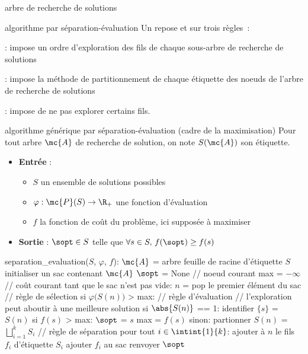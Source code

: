 \begin{adjustwidth}{-3cm}{-3cm}
\begin{definition}{6.10}{arbre de recherche de solutions}
\end{definition}

\begin{definition}{6.10}{algorithme par séparation-évaluation}
    Un  repose  et sur trois règles~:
    \begin{enumeratebf}
        \item {} : impose un ordre d'exploration des fils de chaque sous-arbre de recherche de solutions
        \item {} : impose la méthode de partitionnement de chaque étiquette des noeuds de l'arbre de recherche de solutions
        \item {} : impose de ne pas explorer certains fils.
    \end{enumeratebf}
\end{definition}

\begin{implementation}{algorithme générique par séparation-évaluation (cadre de la maximisation)}
    Pour tout arbre $\mc{A}$ de recherche de solution, on note $S(\mc{A})$ son étiquette.
    \begin{itemize}
        \item \textbf{Entrée} :
        \begin{itemize}
            \item $S$ un ensemble de solutions possibles
            \item $\varphi : \mc{P}(S) \to \R_+$ une fonction d'évaluation
            \item $f$ la fonction de coût du problème, ici supposée à maximiser
        \end{itemize}
        \item \textbf{Sortie} : $\sopt \in S$ telle que $\forall s \in S,\, f(\sopt) \geq f(s)$
    \end{itemize}
    \begin{lstLNat}
    separation_evaluation($S$, $\varphi$, $f$):
        $\mc{A}$ = arbre feuille de racine d'étiquette $S$
        initialiser un sac contenant $\mc{A}$
        $\sopt$ = None // noeud courant
        max = $-\infty$ // coût courant
        tant que le sac n'est pas vide:
            $n$ = pop le premier élément du sac // règle de sélection
            si $\varphi\big(S(n)\big)$ > max: // règle d'évaluation
                // l'exploration peut aboutir à une meilleure solution
                si $\abs{S(n)}$ == 1:
                    identifier $\{s\}$ = $S(n)$
                    si $f(s)$ > max:
                        $\sopt$ = $s$
                        max = $f(s)$
                sinon:
                    partionner $S(n)$ = $\bigsqcup_{i=1}^{k}S_i$ // règle de séparation
                    pour tout $i \in \intint{1}{k}$:
                        ajouter à $n$ le fils $f_i$ d'étiquette $S_i$
                        ajouter $f_i$ au sac
        renvoyer $\sopt$


\end{lstLNat}
\end{implementation}
\end{adjustwidth}
